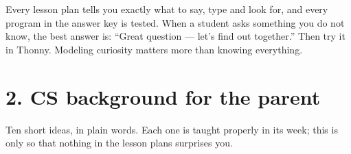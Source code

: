 \documentclass[level=3,teacher]{kidscode}
\begin{document}
\begin{teachernote}
Every lesson plan tells you exactly what to say, type and look for, and every program in the
answer key is tested. When a student asks something you do not know, the best answer is:
\enquote{Great question --- let's find out together.} Then try it in Thonny. Modeling curiosity
matters more than knowing everything.
\end{teachernote}

\section{2. CS background for the parent}

Ten short ideas, in plain words. Each one is taught properly in its week; this is only so that
nothing in the lesson plans surprises you.
\end{document}
